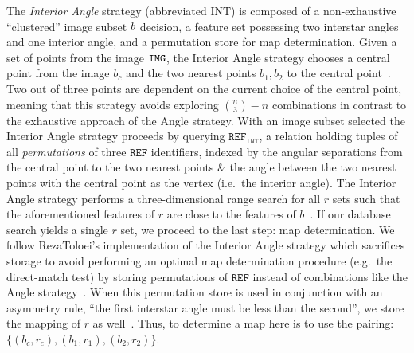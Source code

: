 The \textit{Interior Angle} strategy (abbreviated INT) is composed of a non-exhaustive ``clustered'' image subset $b$ decision, a feature set possessing two interstar angles and one interior angle, and a permutation store for map determination.
Given a set of points from the image $\texttt{IMG}$, the Interior Angle strategy chooses a central point from the image $b_c$ and the two nearest points $b_1, b_2$ to the central point~\cite{liebe:starTrackersAttitudeDetermination}.
Two out of three points are dependent on the current choice of the central point, meaning that this strategy avoids exploring $\binom{n}{3} - n$ combinations in contrast to the exhaustive approach of the Angle strategy.
With an image subset selected the Interior Angle strategy proceeds by querying $\texttt{REF}_\texttt{INT}$, a relation holding tuples of all \emph{permutations} of three $\texttt{REF}$ identifiers, indexed by the angular separations from the central point to the two nearest points \& the angle between the two nearest points with the central point as the vertex (i.e.\ the interior angle).
The Interior Angle strategy performs a three-dimensional range search for all $r$ sets such that the aforementioned features of $r$ are close to the features of $b$~\cite{bratt:analysisStarIdentification}.
If our database search yields a single $r$ set, we proceed to the last step: map determination.
We follow RezaToloei's implementation of the Interior Angle strategy which sacrifices storage to avoid performing an optimal map determination procedure (e.g.\ the direct-match test) by storing permutations of $\texttt{REF}$ instead of combinations like the Angle strategy~\cite{toloei:compositeIdentification}.
When this permutation store is used in conjunction with an asymmetry rule, ``the first interstar angle must be less than the second'', we store the mapping of $r$ as well~\cite{anderson:autonomousStarSensing}.
Thus, to determine a map here is to use the pairing: $\{(b_c, r_c), (b_1, r_1), (b_2, r_2)\}$.


